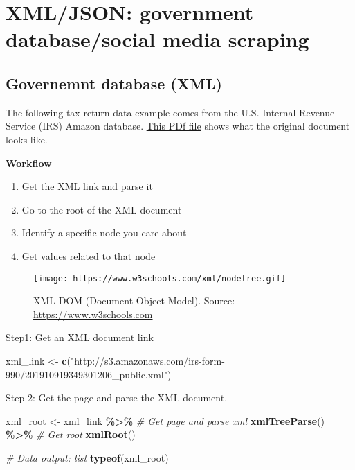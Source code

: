 \documentclass[
]{book}
\newenvironment{Shaded}{\begin{snugshade}}{\end{snugshade}}
\newcommand{\CommentTok}[1]{\textcolor[rgb]{0.56,0.35,0.01}{\textit{#1}}}
\newcommand{\KeywordTok}[1]{\textcolor[rgb]{0.13,0.29,0.53}{\textbf{#1}}}
\newcommand{\NormalTok}[1]{#1}
\newcommand{\OperatorTok}[1]{\textcolor[rgb]{0.81,0.36,0.00}{\textbf{#1}}}
\newcommand{\StringTok}[1]{\textcolor[rgb]{0.31,0.60,0.02}{#1}}
\providecommand{\tightlist}{%
  \setlength{\itemsep}{0pt}\setlength{\parskip}{0pt}}
\begin{document}
\hypertarget{xmljson-government-databasesocial-media-scraping}{%
\section{XML/JSON: government database/social media scraping}\label{xmljson-government-databasesocial-media-scraping}}

\hypertarget{governemnt-database-xml}{%
\subsection{Governemnt database (XML)}\label{governemnt-database-xml}}

The following tax return data example comes from the U.S. Internal Revenue Service (IRS) Amazon database. \href{https://www.irs.gov/pub/irs-pdf/f990.pdf}{This PDf file} shows what the original document looks like.

\textbf{Workflow}

\begin{enumerate}
\def\labelenumi{\arabic{enumi}.}
\tightlist
\item
  Get the XML link and parse it
\item
  Go to the root of the XML document
\item
  Identify a specific node you care about
\item
  Get values related to that node
\end{enumerate}

\begin{figure}
\centering
\texttt{[image: https://www.w3schools.com/xml/nodetree.gif]}
\caption{XML DOM (Document Object Model). Source: \url{https://www.w3schools.com}}
\end{figure}

Step1: Get an XML document link

\begin{Shaded}
\begin{Highlighting}[]
\NormalTok{xml\_link \textless{}{-}}\StringTok{ }\KeywordTok{c}\NormalTok{(}\StringTok{"http://s3.amazonaws.com/irs{-}form{-}990/201910919349301206\_public.xml"}\NormalTok{)}
\end{Highlighting}
\end{Shaded}

Step 2: Get the page and parse the XML document.

\begin{Shaded}
\begin{Highlighting}[]
\NormalTok{xml\_root \textless{}{-}}\StringTok{ }\NormalTok{xml\_link }\OperatorTok{\%\textgreater{}\%}
\StringTok{  }\CommentTok{\# Get page and parse xml }
\StringTok{  }\KeywordTok{xmlTreeParse}\NormalTok{() }\OperatorTok{\%\textgreater{}\%}
\StringTok{  }\CommentTok{\# Get root}
\StringTok{  }\KeywordTok{xmlRoot}\NormalTok{()}

\CommentTok{\# Data output: list }
\KeywordTok{typeof}\NormalTok{(xml\_root) }
\end{Highlighting}
\end{Shaded}
\end{document}
